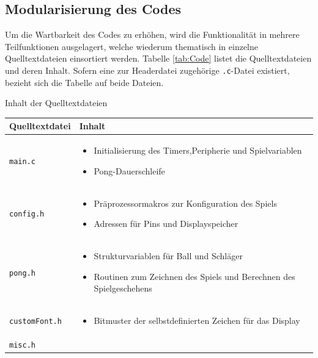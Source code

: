 \subsection{Modularisierung des Codes}
\label{sec:Modularisierung}
Um die Wartbarkeit des Codes zu erhöhen, wird die Funktionalität in mehrere Teilfunktionen ausgelagert, welche wiederum thematisch in einzelne Quelltextdateien einsortiert werden. 
Tabelle \ref{tab:Code} listet die Quelltextdateien und deren Inhalt. Sofern eine zur Headerdatei zugehörige \texttt{.c}-Datei existiert, bezieht sich die Tabelle auf beide Dateien.

\begin{center}
\begin{table}[H]
\caption{Inhalt der Quelltextdateien}
\label{tab:Code}
\end{table}
\begin{longtable}{|p{}|p{}|}
\hline 
Quelltextdatei & Inhalt \\ 
\hline 
\hline
\texttt{main.c} & 	\begin{itemize}
					\setlength\itemsep{-0.5em}
					\item Initialisierung des Timers,Peripherie und Spielvariablen
					\item Pong-Dauerschleife
					\end{itemize} 
\\ 
\hline 
\texttt{config.h} &	\begin{itemize}
					\setlength\itemsep{-0.5em}
					\item Präprozessormakros zur Konfiguration des Spiels
					\item Adressen für Pins und Displayspeicher
					\end{itemize} 
\\ 
\hline 
\texttt{pong.h} &	\begin{itemize}
					\setlength\itemsep{-0.5em}
					\item Strukturvariablen für Ball und Schläger
					\item Routinen zum Zeichnen des Spiels und Berechnen des Spielgeschehens
					\end{itemize} 
\\ 
\hline 
\texttt{customFont.h} &	\begin{itemize}
					\setlength\itemsep{-0.5em}
					\item Bitmuster der selbstdefinierten Zeichen für das Display
					\end{itemize} 
\\ 
\hline 
\texttt{misc.h} &	\begin{itemize}

\end{itemize}
\end{longtable}
\end{center}
